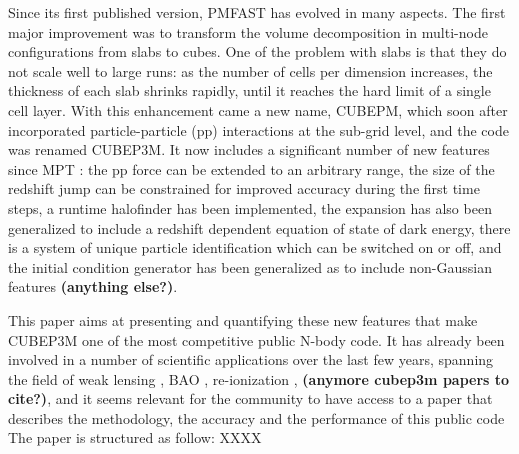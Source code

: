 Since its first published version, {\small PMFAST} has evolved in many aspects. 
The first major improvement was to transform the volume decomposition in multi-node configurations 
from slabs to cubes. One of the problem with slabs is that they do not scale well to large runs: 
as the number of cells per dimension increases, the thickness of each slab shrinks rapidly,
until it reaches the hard limit of a single cell layer.  With this enhancement came a new name, {\small CUBEPM},
which soon after incorporated particle-particle (pp) interactions at the sub-grid level, and the code was renamed
{\small CUBEP3M}. It now includes a significant number of new features since MPT : the pp force
can be extended to an arbitrary range, the size of the redshift jump can be constrained for improved accuracy during the first time steps,
a runtime halofinder has been implemented, the expansion has also been generalized to include a redshift dependent equation of state of dark energy, there is a system of unique particle identification which can be switched on or off, and the initial condition generator has been generalized as to include non-Gaussian features
{\bf (anything else?)}.

This paper aims at presenting and quantifying these new features that make {\small CUBEP3M} one of the most competitive public N-body code.
It has already been involved in a number of scientific applications over the last few years,
spanning the field of weak lensing \citep{Sanaz_Lu, Lu_dore, Dore_Lu, Harnois_Vafaei, LuCMBLensing},  BAO
 \citep{HarnoisPen, Ngan,Zhang, Yu, HarnoisYu in prep.}, re-ionization \citep{Ilian...}, {\bf (anymore cubep3m papers to cite?)},  
and it seems relevant for the community to have access to a paper that describes the methodology, the accuracy and the performance of this public code 
The paper is structured as follow: XXXX 



